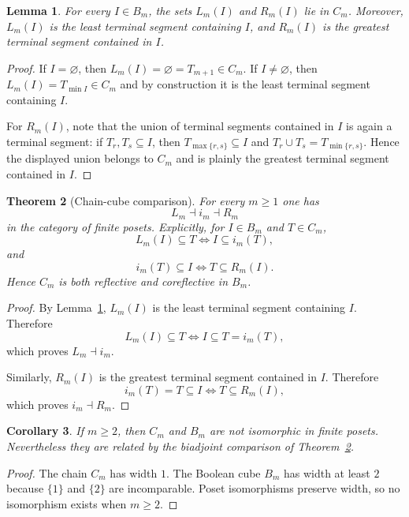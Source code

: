 \documentclass[11pt,a4paper]{article}
\numberwithin{equation}{section}
\newtheorem{theorem}{Theorem}[section]
\newtheorem{lemma}[theorem]{Lemma}
\newtheorem{corollary}[theorem]{Corollary}
\theoremstyle{definition}
\theoremstyle{remark}
\begin{document}
\begin{lemma}\label{P1:lem:LRtails}
For every $I\in B_m$, the sets $L_m(I)$ and $R_m(I)$ lie in $C_m$.  Moreover, $L_m(I)$ is the least terminal segment containing $I$, and $R_m(I)$ is the greatest terminal segment contained in $I$.
\end{lemma}

\begin{proof}
If $I=\varnothing$, then $L_m(I)=\varnothing=T_{m+1}\in C_m$.  If $I\neq\varnothing$, then $L_m(I)=T_{\min I}\in C_m$ and by construction it is the least terminal segment containing $I$.

For $R_m(I)$, note that the union of terminal segments contained in $I$ is again a terminal segment: if $T_r,T_s\subseteq I$, then $T_{\max\{r,s\}}\subseteq I$ and $T_r\cup T_s=T_{\min\{r,s\}}$.  Hence the displayed union belongs to $C_m$ and is plainly the greatest terminal segment contained in $I$.
\end{proof}

\begin{theorem}[Chain-cube comparison]\label{P1:thm:chain-cube}
For every $m\ge1$ one has
\[
L_m\dashv i_m\dashv R_m
\]
in the category of finite posets.  Explicitly, for $I\in B_m$ and $T\in C_m$,
\[
L_m(I)\subseteq T \iff I\subseteq i_m(T),
\]
and
\[
i_m(T)\subseteq I \iff T\subseteq R_m(I).
\]
Hence $C_m$ is both reflective and coreflective in $B_m$.
\end{theorem}

\begin{proof}
By Lemma~\ref{P1:lem:LRtails}, $L_m(I)$ is the least terminal segment containing $I$.  Therefore
\[
L_m(I)\subseteq T\iff I\subseteq T=i_m(T),
\]
which proves $L_m\dashv i_m$.

Similarly, $R_m(I)$ is the greatest terminal segment contained in $I$.  Therefore
\[
i_m(T)=T\subseteq I\iff T\subseteq R_m(I),
\]
which proves $i_m\dashv R_m$.
\end{proof}

\begin{corollary}\label{P1:cor:not-iso-chain-cube}
If $m\ge2$, then $C_m$ and $B_m$ are not isomorphic in finite posets.  Nevertheless they are related by the biadjoint comparison of Theorem~\ref{P1:thm:chain-cube}.
\end{corollary}

\begin{proof}
The chain $C_m$ has width $1$.  The Boolean cube $B_m$ has width at least $2$ because $\{1\}$ and $\{2\}$ are incomparable.  Poset isomorphisms preserve width, so no isomorphism exists when $m\ge2$.
\end{proof}
\end{document}
